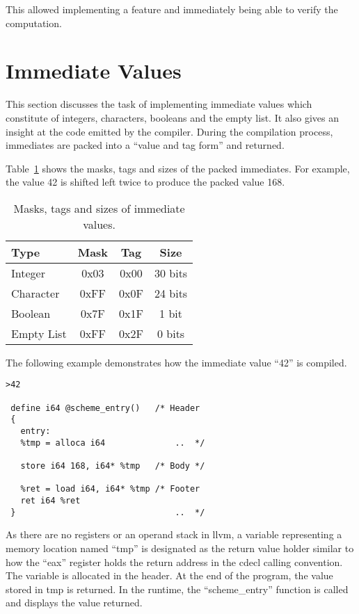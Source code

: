\documentclass{article}
\begin{document}
This allowed implementing a feature and immediately being able to verify the computation.



\section{Immediate Values}

This section discusses the task of implementing immediate values which constitute of integers, characters, booleans and the empty list. It also gives an insight at the code emitted by the compiler. During the compilation process, immediates are packed into a ``value and tag form'' and returned.

Table~\ref{tab:immediates} shows the masks, tags and sizes of the packed immediates. For example, the value 42 is shifted left twice to produce the packed value 168. 

\begin{table}[ht]
  \centering
\begin{tabular}{ l c c c }
  \toprule
  Type & Mask & Tag & Size \\ \hline
  \midrule
  Integer & 0x03 & 0x00 & 30 bits  \\
  Character & 0xFF & 0x0F & 24 bits  \\
  Boolean & 0x7F & 0x1F & 1 bit \\
  Empty List & 0xFF & 0x2F & 0 bits \\
  \bottomrule
\end{tabular}
\caption{Masks, tags and sizes of immediate values.} \label{tab:immediates}
\end{table}

The following example demonstrates how the immediate value ``42'' is compiled. 

\begin{verbatim}
>42

 define i64 @scheme_entry()   /* Header 
 {                            
   entry:
   %tmp = alloca i64              ..  */

   store i64 168, i64* %tmp   /* Body */ 

   %ret = load i64, i64* %tmp /* Footer
   ret i64 %ret                   
 }                                ..  */
\end{verbatim}

As there are no registers or an operand stack in llvm, a variable representing a memory location named ``tmp'' is designated as the return value holder similar to how the ``eax'' register holds the return address in the cdecl calling convention. The variable is allocated in the header. At the end of the program, the value stored in tmp is returned. In the runtime, the ``scheme\_entry'' function is called and displays the value returned. 
\end{document}
